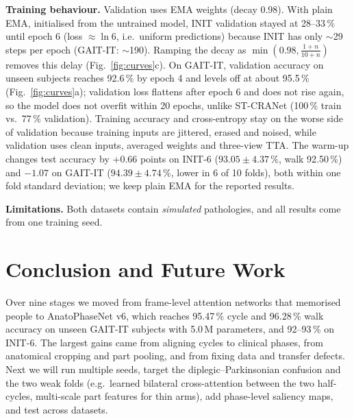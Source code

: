 \documentclass[conference]{IEEEtran}
\begin{document}
\textbf{Training behaviour.} Validation uses EMA weights (decay 0.98). With
plain EMA, initialised from the untrained model, INIT validation stayed at
28--33\,\% until epoch 6 (loss $\approx\ln 6$, i.e.\ uniform predictions)
because INIT has only $\sim$29 steps per epoch (GAIT-IT: $\sim$190). Ramping
the decay as $\min(0.98,\frac{1+n}{10+n})$ removes this delay
(Fig.~\ref{fig:curves}c). On GAIT-IT, validation accuracy on unseen subjects
reaches 92.6\,\% by epoch 4 and levels off at about 95.5\,\%
(Fig.~\ref{fig:curves}a); validation loss flattens after epoch 6 and does not
rise again, so the model does not overfit within 20 epochs, unlike ST-CRANet
(100\,\% train vs.\ 77\,\% validation). Training accuracy and cross-entropy stay
on the worse side of validation because training inputs are jittered, erased
and noised, while validation uses clean inputs, averaged weights and
three-view TTA. The warm-up changes test accuracy by +0.66 points on INIT-6
($93.05\pm4.37\,\%$, walk 92.50\,\%) and $-1.07$ on GAIT-IT
($94.39\pm4.74\,\%$, lower in 6 of 10 folds), both within one fold standard
deviation; we keep plain EMA for the reported results.

\textbf{Limitations.} Both datasets contain \emph{simulated} pathologies, and
all results come from one training seed.

\section{Conclusion and Future Work}
Over nine stages we moved from frame-level attention networks that memorised
people to AnatoPhaseNet v6, which reaches 95.47\,\% cycle and 96.28\,\% walk
accuracy on unseen GAIT-IT subjects with 5.0\,M parameters, and 92--93\,\% on
INIT-6. The largest gains came from aligning cycles to clinical phases, from
anatomical cropping and part pooling, and from fixing data and transfer
defects. Next we will run multiple seeds, target the diplegic--Parkinsonian
confusion and the two weak folds (e.g.\ learned bilateral cross-attention
between the two half-cycles, multi-scale part features for thin arms), add
phase-level saliency maps, and test across datasets.
\end{document}
